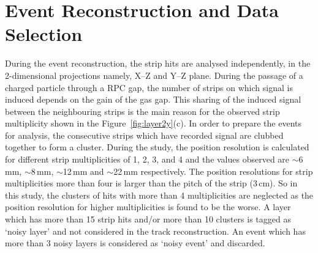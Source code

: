 \section{Event Reconstruction and Data Selection}\label{sec:reconstrction}
During the event reconstruction, the strip hits are analysed
independently, in the 2-dimensional projections namely,
\mbox{X--Z} and \mbox{Y--Z} plane. During the passage of a charged
particle through a RPC gap, the number of strips on which signal is
induced depends on the gain of the gas gap. This sharing of the induced
signal between the neighbouring strips is the main reason for the
observed strip multiplicity shown in the Figure~\ref{fig:layer2y}(c).
In order to prepare the events for analysis, the consecutive strips
which have recorded signal are clubbed together to form a cluster.
During the study, the position resolution is calculated for different
strip multiplicities of 1, 2, 3, and 4 and the values observed are
$\sim$6\,mm, $\sim$8\,mm, $\sim$12\,mm and $\sim$22\,mm respectively.
The position resolutions for strip multiplicities more than four is
larger than the pitch of the strip (3\,cm). So in this study,
the clusters of hits with more than 4 multiplicities are neglected
as the position resolution for higher multiplicities is found to be
the worse. A layer which has more than 15 strip hits and/or more
than 10 clusters is tagged as `noisy layer' and not considered
in the track reconstruction. An event which has more than 3 noisy
layers is considered as `noisy event' and discarded.
